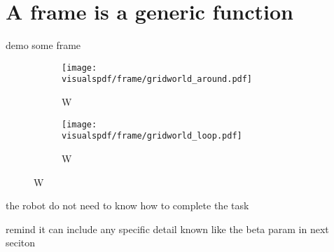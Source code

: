 % 

\section{A frame is a generic function}
\label{chapter:limitations:framegeneric}

demo some frame

\begin{figure}[!ht]
\centering
    \begin{subfigure}[b]{0.49\columnwidth}
        \centering
        \texttt{[image: \\visualspdf/frame/gridworld\_around.pdf]}
        \caption{W}
        \label{fig:gridwolrdgenericframesaround}
    \end{subfigure}
    \begin{subfigure}[b]{0.49\columnwidth}
        \centering
        \texttt{[image: \\visualspdf/frame/gridworld\_loop.pdf]}
        \caption{W}
        \label{fig:gridwolrdgenericframesloop}
    \end{subfigure}
\caption{W}
\label{fig:gridwolrdgenericframes}
\end{figure}


the robot do not need to know how to complete the task

remind it can include any specific detail known
like the beta param in next seciton

% 





% 


